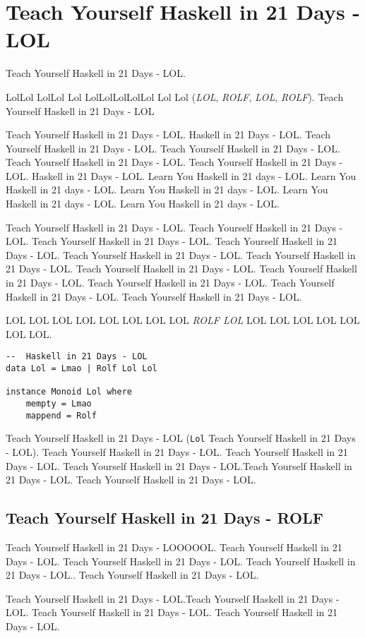 \section{Teach Yourself Haskell in 21 Days - LOL}

Teach Yourself Haskell in 21 Days - LOL.

LolLol LolLol Lol LolLolLolLolLol Lol Lol (\emph{LOL}, \emph{ROLF}, \emph{LOL}, \emph{ROLF}). Teach Yourself Haskell in 21 Days - LOL

Teach Yourself Haskell in 21 Days - LOL.  Haskell in 21 Days - LOL. Teach Yourself Haskell in 21 Days - LOL. Teach Yourself Haskell in 21 Days - LOL. Teach Yourself Haskell in 21 Days - LOL. Teach Yourself Haskell in 21 Days - LOL.  Haskell in 21 Days - LOL. Learn You Haskell in 21 days - LOL. Learn You Haskell in 21 days - LOL. Learn You Haskell in 21 days - LOL. Learn You Haskell in 21 days - LOL. Learn You Haskell in 21 days - LOL.

Teach Yourself Haskell in 21 Days - LOL. Teach Yourself Haskell in 21 Days - LOL. Teach Yourself Haskell in 21 Days - LOL. Teach Yourself Haskell in 21 Days - LOL. Teach Yourself Haskell in 21 Days - LOL. Teach Yourself Haskell in 21 Days - LOL. Teach Yourself Haskell in 21 Days - LOL. Teach Yourself Haskell in 21 Days - LOL. Teach Yourself Haskell in 21 Days - LOL. Teach Yourself Haskell in 21 Days - LOL. Teach Yourself Haskell in 21 Days - LOL.

LOL LOL LOL LOL LOL LOL LOL LOL \emph{ROLF LOL} LOL LOL LOL LOL LOL LOL LOL.

\begin{verbatim}
--  Haskell in 21 Days - LOL
data Lol = Lmao | Rolf Lol Lol

instance Monoid Lol where
    mempty = Lmao
    mappend = Rolf

\end{verbatim}

Teach Yourself Haskell in 21 Days - LOL (\texttt{Lol} Teach Yourself Haskell in 21 Days - LOL). Teach Yourself Haskell in 21 Days - LOL. Teach Yourself Haskell in 21 Days - LOL. Teach Yourself Haskell in 21 Days - LOL.Teach Yourself Haskell in 21 Days - LOL. Teach Yourself Haskell in 21 Days - LOL.

\subsection{Teach Yourself Haskell in 21 Days - ROLF}

Teach Yourself Haskell in 21 Days - LOOOOOL. Teach Yourself Haskell in 21 Days - LOL. Teach Yourself Haskell in 21 Days - LOL. Teach Yourself Haskell in 21 Days - LOL.. Teach Yourself Haskell in 21 Days - LOL.

Teach Yourself Haskell in 21 Days - LOL.Teach Yourself Haskell in 21 Days - LOL. Teach Yourself Haskell in 21 Days - LOL. Teach Yourself Haskell in 21 Days - LOL.
